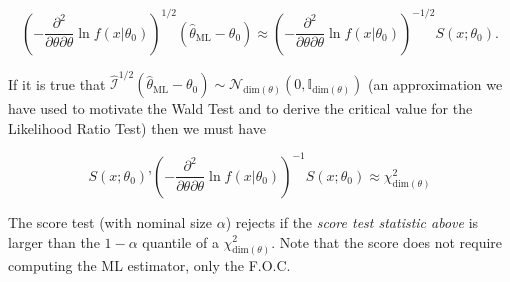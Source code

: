 \documentclass[11pt]{article} %
\begin{document}
\[ \left( -\frac{\partial^2}{\partial \theta \partial \theta} \ln f(x | \theta_0) \right)^{1/2} \left( \widehat{\theta}_{\textrm{ML}} - \theta_0 \right)  \approx  \left( -\frac{\partial^2}{\partial \theta \partial \theta} \ln f(x | \theta_0) \right)^{-1/2} S(x; \theta_0).  \]

\noindent If it is true that $\widehat{\mathcal{I}}^{1/2}(\widehat{\theta}_{\textrm{ML}}-\theta_0) \sim \mathcal{N}_{\textrm{dim}(\theta)} (0, \mathbb{I}_{\textrm{dim}(\theta)})$ (an approximation we have used to motivate the Wald Test and to derive the critical value for the Likelihood Ratio Test) then we must have

\[  S(x; \theta_0)’ \left( -\frac{\partial^2}{\partial \theta \partial \theta} \ln f(x | \theta_0) \right)^{-1} S(x; \theta_0) \approx \chi^2_{\textrm{dim}(\theta)} \]

\noindent The score test (with nominal size $\alpha$) rejects if the \emph{score test statistic above} is larger than the $1-\alpha$ quantile of a $\chi^2_{\textrm{dim}(\theta)}$. Note that the score does not require computing the ML estimator, only the F.O.C. 

\newpage




\end{document}
